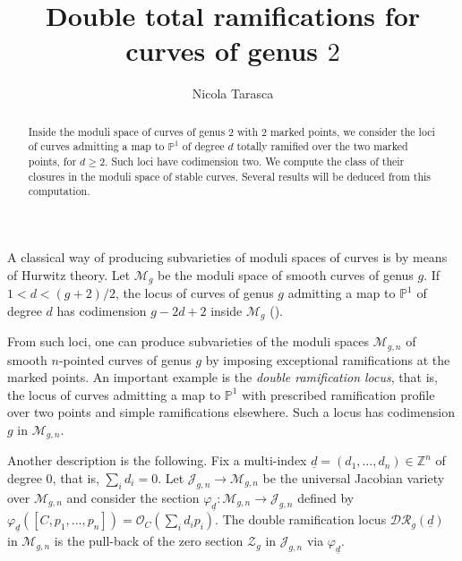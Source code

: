 \documentclass[10pt]{amsart}
\theoremstyle{definition}
\begin{document}
\title{Double total ramifications for curves of genus $2$}
\author{Nicola Tarasca}
\address{University of Utah, Department of Mathematics, 155 S 1400 E, Salt Lake City, UT 84112, USA}

\begin{abstract}
Inside the moduli space of curves of genus $2$ with $2$ marked points, we consider the loci of curves admitting a map to $\mathbb{P}^1$ of degree $d$ totally ramified over the two marked points, for $d\geq 2$. Such loci have codimension two. We compute the class of their closures in the moduli space of stable curves. Several results will be deduced from this computation. 
\end{abstract}

\maketitle

A classical way of producing subvarieties of moduli spaces of curves is by means of Hurwitz theory. Let ${\mathcal{M}}_g$ be the moduli space of smooth curves of genus $g$. If $1<d<(g+2)/2$, the locus of curves of genus $g$ admitting a map to $\mathbb{P}^1$ of degree $d$ has codimension $g-2d+2$ inside ${\mathcal{M}}_g$ (\cite{MR626954}).

From such loci, one can produce subvarieties of the moduli spaces ${\mathcal{M}}_{g,n}$ of smooth $n$-pointed curves of genus $g$ by imposing exceptional ramifications at the marked points. An important example is the {\it double ramification locus}, that is, the locus of curves admitting a map to $\mathbb{P}^1$ with prescribed ramification profile over two points and simple ramifications elsewhere. 
Such a locus has codimension $g$ in ${\mathcal{M}}_{g,n}$.
 
Another description is the following. Fix a multi-index $\underline{d}=(d_1,\dots,d_n)\in \mathbb{Z}^n$ of degree $0$, that is, $\sum_i d_i=0$.
Let $\mathcal{J}_{g,n}\rightarrow {\mathcal{M}}_{g,n}$ be the universal Jacobian variety over ${\mathcal{M}}_{g,n}$ and consider the section $\varphi_{\underline{d}}\colon {\mathcal{M}}_{g,n}\rightarrow \mathcal{J}_{g,n}$ defined by $\varphi_{\underline{d}}([C,p_1,\dots,p_n])=\mathcal{O}_C(\sum_{i} d_i p_i)$. 
The double ramification locus $\mathcal{DR}_g(\underline{d})$ in ${\mathcal{M}}_{g,n}$ is 
the pull-back of the zero section $\mathcal{Z}_g$ in $\mathcal{J}_{g,n}$ via $\varphi_{\underline{d}}$.
\end{document}
